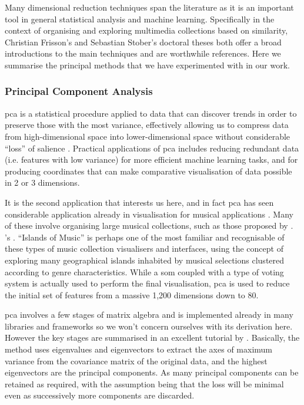 Many dimensional reduction techniques span the literature as it is an important tool in general statistical analysis and machine learning. Specifically in the context of organising and exploring multimedia collections based on similarity, Christian Frisson's \citeyearpar{frisson2015} and Sebastian Stober's \citeyearpar{Stober2012a} doctoral theses both offer a broad introductions to the main techniques and are worthwhile references. Here we summarise the principal methods that we have experimented with in our work.

\subsubsection{Principal Component Analysis}

\acrfull{pca} is a statistical procedure applied to data that can discover trends in order to preserve those with the most variance, effectively allowing us to compress data from high-dimensional space into lower-dimensional space without considerable ``loss'' of salience \citep{Hackeling2014}. Practical applications of \acrshort{pca} includes reducing redundant data (i.e. features with low variance) for more efficient machine learning tasks, and for producing coordinates that can make comparative visualisation of data possible in 2 or 3 dimensions.

It is the second application that interests us here, and in fact \acrshort{pca} has seen considerable application already in visualisation for musical applications \citep{Cooper2006}. Many of these involve organising large musical collections, such as those proposed by \cite{tzan2000, Tzanetakis2000, Tzanetakis2001a, Brazil2002, Pavlidis2006}. \citeauthor{Pampalk2001}'s \citeyearpar{Pampalk2001}. ``Islands of Music'' is perhaps one of the most familiar and recognisable of these types of music collection visualisers and interfaces, using the concept of exploring many geographical islands inhabited by musical selections clustered according to genre characteristics. While a \acrfull{som} coupled with a type of voting system is actually used to perform the final visualisation, \acrshort{pca} is used to reduce the initial set of features from a massive 1,200 dimensions down to 80.

\acrshort{pca} involves a few stages of matrix algebra and is implemented already in many libraries and frameworks so we won't concern ourselves with its derivation here. However the key stages are summarised in an excellent tutorial by \cite{Smith2002a}. Basically, the method uses eigenvalues and eigenvectors to extract the axes of maximum variance from the covariance matrix of the original data, and the highest eigenvectors are the principal components. As many principal components can be retained as required, with the assumption being that the loss will be minimal even as successively more components are discarded.

